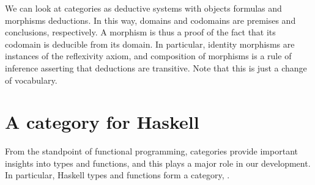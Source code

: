 \begin{example}



  \label{ex:deductive-system}

  We can look at categories as deductive systems with objects formulas
  and morphisms deductions. In this way, domains and codomains are
  premises and conclusions, respectively. A morphism is thus a proof
  of the fact that its codomain is deducible from its domain. In
  particular, identity morphisms are instances of the reflexivity
  axiom, and composition of morphisms is a rule of inference asserting
  that deductions are transitive. Note that this is just a change of
  vocabulary.


\end{example}

\section{A category for Haskell}
\label{sec:category-haskell}

From the standpoint of functional programming, categories provide
important insights into types and functions, and this plays a major
role in our development. In particular, Haskell types and functions
form a category, \hask.

